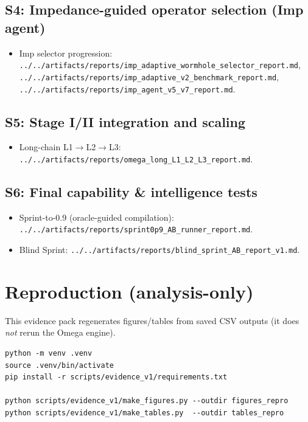\documentclass[10pt]{article}
\begin{document}
\subsection{S4: Impedance-guided operator selection (Imp agent)}
\begin{itemize}[leftmargin=*]
\item Imp selector progression: \texttt{../../artifacts/reports/imp\_adaptive\_wormhole\_selector\_report.md}, \texttt{../../artifacts/reports/imp\_adaptive\_v2\_benchmark\_report.md}, \texttt{../../artifacts/reports/imp\_agent\_v5\_v7\_report.md}.
\end{itemize}

\subsection{S5: Stage I/II integration and scaling}
\begin{itemize}[leftmargin=*]
\item Long-chain L1\(\rightarrow\)L2\(\rightarrow\)L3: \texttt{../../artifacts/reports/omega\_long\_L1\_L2\_L3\_report.md}.
\end{itemize}

\subsection{S6: Final capability \& intelligence tests}
\begin{itemize}[leftmargin=*]
\item Sprint-to-0.9 (oracle-guided compilation): \texttt{../../artifacts/reports/sprint0p9\_AB\_runner\_report.md}.
\item Blind Sprint: \texttt{../../artifacts/reports/blind\_sprint\_AB\_report\_v1.md}.
\end{itemize}

\section{Reproduction (analysis-only)}
This evidence pack regenerates figures/tables from saved CSV outputs (it does \emph{not} rerun the Omega engine).
\begin{verbatim}
python -m venv .venv
source .venv/bin/activate
pip install -r scripts/evidence_v1/requirements.txt

python scripts/evidence_v1/make_figures.py --outdir figures_repro
python scripts/evidence_v1/make_tables.py  --outdir tables_repro
\end{verbatim}
\end{document}
